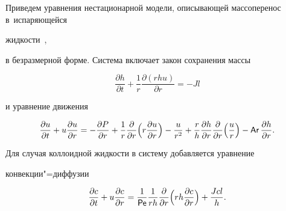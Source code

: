 \pagebreak



\hypertarget{kol:3}{}



 \linebreak

Приведем уравнения нестационарной модели, описывающей массоперенос \linebreak в~испаряющейся

жидкости~\cite{Kolegov2014a,Kolegov2014b,Kolegov2014c,KolegovLobanov2012},

в безразмерной форме. Система включает закон сохранения массы

\begin{equation}\label{eq:massConservationLaw}

  \frac{\partial h}{\partial t}+\frac{1}{r}\frac{\partial \left(rhu\right)}{\partial r}=-Jl

\end{equation}

и уравнение движения

\begin{equation}\label{eq:motionEquation}

 \frac{\partial u}{\partial t} + u\frac{\partial u}{\partial r} =  -

 \frac{\partial P}{\partial r} + \frac{1}{r}\frac{\partial }{\partial r}

 \Bigl( r\frac{\partial u}{\partial r} \Bigr)

 - \frac{u}{r^2} + \frac{r}{h}\frac{\partial h}{\partial r}\frac{\partial }{\partial r}

 \Bigl( \frac{u}{r} \Bigr)

 - \Ar\frac{\partial h}{\partial r}.

\end{equation}

Для случая коллоидной жидкости в систему добавляется уравнение

конвекции"=диффузии

\begin{equation}\label{eq:convectionDiffusion}

\frac{\partial c}{\partial t} + u\frac{\partial c}{\partial r} =

\frac{1}{\Pe}\frac{1}{rh}\frac{\partial }{\partial r}

\Bigl(

rh\frac{\partial c}{\partial r} \Bigr) + \frac{Jcl}{h}.

\end{equation}

